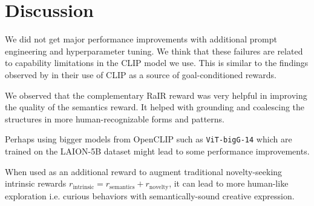 \chapter{Discussion}
\label{sec:discussion}


We did not get major performance improvements with additional prompt engineering and hyperparameter tuning.
We think that these failures are related to capability limitations in the CLIP model we use.
This is similar to the findings observed by \cite{vlmrm} in their use of CLIP as a source of goal-conditioned rewards.



We observed that the complementary RaIR reward was very helpful in improving the quality of the semantics reward.
It helped with grounding and coalescing the structures in more human-recognizable forms and patterns.


Perhaps using bigger models from OpenCLIP such as \texttt{ViT-bigG-14} \citep{openclip} which are trained on the LAION-5B dataset \citep{laion5b} might lead to some performance improvements.


When used as an additional reward to augment traditional novelty-seeking intrinsic rewards \(r_{\text{intrinsic}} = r_{\text{semantics}} + r_{\text{novelty}}\), it can lead to more human-like exploration i.e. curious behaviors with semantically-sound creative expression.
